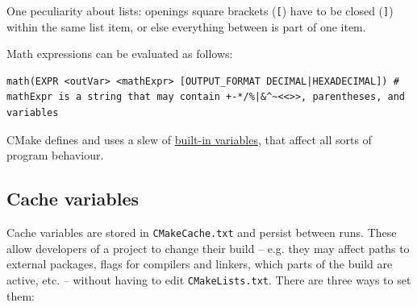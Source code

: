 \documentclass[table, xcdraw]{article}%
\begin{document}
One peculiarity about lists: openings square brackets (\texttt{[}) have to be closed (\texttt{]}) within the same list item, or else everything between is part of one item.

Math expressions can be evaluated as follows:

\begin{verbatim}
math(EXPR <outVar> <mathExpr> [OUTPUT_FORMAT DECIMAL|HEXADECIMAL]) # mathExpr is a string that may contain +-*/%|&^~<<>>, parentheses, and variables
\end{verbatim}

CMake defines and uses a slew of \href{https://cmake.org/cmake/help/latest/manual/cmake-variables.7.html}{built-in variables}, that affect all sorts of program behaviour.

\subsection{Cache variables} \label{cache_variables}

Cache variables are stored in \texttt{CMakeCache.txt} and persist between runs. These allow developers of a project to change their build -- e.g. they may affect paths to external packages, flags for compilers and linkers, which parts of the build are active, etc. -- without having to edit \texttt{CMakeLists.txt}. There are three ways to set them:
\end{document}
